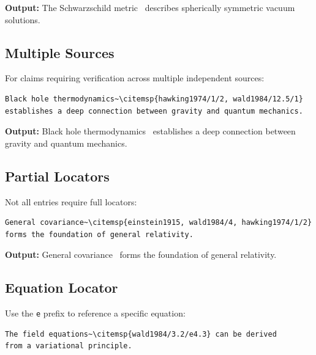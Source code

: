 \documentclass[11pt, a4paper]{article}
\begin{document}
\noindent\textbf{Output:} The Schwarzschild metric~ describes spherically symmetric vacuum solutions.


\subsection{Multiple Sources}

For claims requiring verification across multiple independent sources:

\begin{tcolorbox}[colback=blue!3, colframe=blue!30, boxrule=0.5pt, arc=2pt, top=6pt, bottom=6pt, left=10pt, right=10pt]
\begin{verbatim}
Black hole thermodynamics~\citemsp{hawking1974/1/2, wald1984/12.5/1}
establishes a deep connection between gravity and quantum mechanics.
\end{verbatim}
\end{tcolorbox}

\noindent\textbf{Output:} Black hole thermodynamics~ establishes a deep connection between gravity and quantum mechanics.


\subsection{Partial Locators}

Not all entries require full locators:

\begin{tcolorbox}[colback=blue!3, colframe=blue!30, boxrule=0.5pt, arc=2pt, top=6pt, bottom=6pt, left=10pt, right=10pt]
\begin{verbatim}
General covariance~\citemsp{einstein1915, wald1984/4, hawking1974/1/2}
forms the foundation of general relativity.
\end{verbatim}
\end{tcolorbox}

\noindent\textbf{Output:} General covariance~ forms the foundation of general relativity.


\subsection{Equation Locator}

Use the \texttt{e} prefix to reference a specific equation:

\begin{tcolorbox}[colback=blue!3, colframe=blue!30, boxrule=0.5pt, arc=2pt, top=6pt, bottom=6pt, left=10pt, right=10pt]
\begin{verbatim}
The field equations~\citemsp{wald1984/3.2/e4.3} can be derived
from a variational principle.
\end{verbatim}
\end{tcolorbox}
\end{document}

